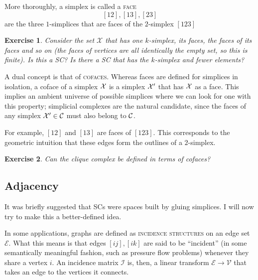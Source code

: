 \documentclass{tufte-handout}
\newtheorem{exercise}{Exercise}
\newcommand{\define}{\textsc}
\newcommand{\ve}{\mathcal{V}}
\begin{document}
More thoroughly, a simplex is called a \define{face} 
\[
[12],[13],[23]
\]
are the three $1$-simplices that are faces of the $2$-simplex $[123]$
\begin{exercise}
Consider the set $\mathcal X$ that has one $k$-simplex, its faces, the faces of its faces and so on (the faces of vertices are all identically the empty set, so this is finite). Is this a SC? Is there a SC that has the $k$-simplex and fewer elements?
\end{exercise}

A dual concept is that of \define{cofaces}. Whereas faces are defined for simplices in isolation, a coface of a simplex $\se$ is a simplex $\se'$ that has $\se$ as a face. This implies an ambient universe of possible simplices where we can look for one with this property; simplicial complexes are the natural candidate, since the faces of any simplex $\se'\in \sc$ must also belong to $\sc$. 

For example, $[12]$ and $[13]$ are faces of $[123]$. This corresponds to the geometric intuition that these edges form the outlines of a $2$-simplex.
\begin{exercise}
Can the clique complex be defined in terms of cofaces?
\end{exercise}


\subsection{Adjacency}

It was briefly suggested that SCs were spaces built by gluing simplices. I will now try to make this a better-defined idea.

In some applications, graphs are defined as \define{incidence structures} on an edge set $\mathcal E$. What this means is that edges $[ij],[ik]$ are said to be ``incident'' (in some semantically meaningful fashion, such as pressure flow problems) whenever they share a vertex $i$. An incidence matrix $\mathcal I$ is, then, a linear transform $\mathcal E\to \ve$ that takes an edge to the vertices it connects.
\end{document}
